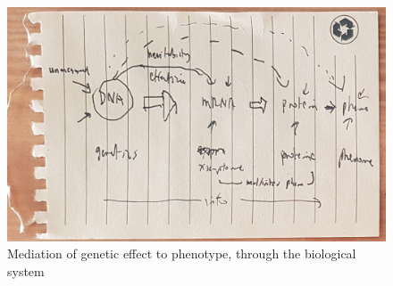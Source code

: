 \begin{outline}
%
%
%

\begin{figure}
    \centering
    \includegraphics[width=1.0\textwidth,page=1]{mainmatter/figures/chapter_01/fig_mockup_systemsBio_Screenshot 2020-05-21 at 17.08.47.png}
    \caption{Mediation of genetic effect to phenotype, through the biological system}
    \label{fig:intro_sysBio}
\end{figure}


\end{outline}
